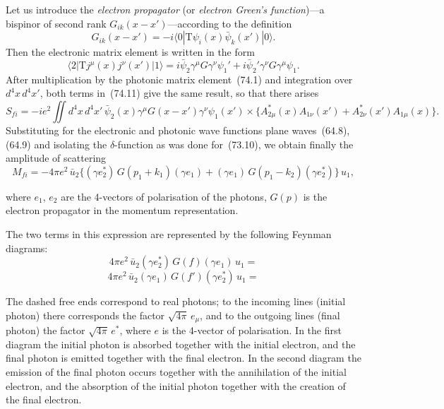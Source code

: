 Let us introduce the \textit{electron propagator} (or \textit{electron Green's function})---a bispinor of second rank $G_{ik}(x - x')$---according to the definition
\begin{equation}
G_{ik}(x - x') = -i\langle 0|\mathrm{T}\psi_i(x)\bar{\psi}_k(x')|0\rangle.
\tag{74.10}
\end{equation}
Then the electronic matrix element is written in the form
\begin{equation}
\langle 2|\mathrm{T}j^\mu(x)j^\nu(x')|1\rangle = i\bar{\psi}_2\gamma^\mu G\gamma^\nu\psi_1' + i\bar{\psi}_2'\gamma^\nu G\gamma^\mu\psi_1.
\tag{74.11}
\end{equation}
After multiplication by the photonic matrix element~(74.1) and integration over $d^4x\,d^4x'$, both terms in~(74.11) give the same result, so that there arises
\begin{equation}
S_{fi} = -ie^2\iint d^4x\,d^4x'\,\bar{\psi}_2(x)\gamma^\mu G(x - x')\gamma^\nu\psi_1(x') \times \{A^*_{2\mu}(x)A_{1\nu}(x') + A^*_{2\nu}(x')A_{1\mu}(x)\}.
\tag{74.12}
\end{equation}
Substituting for the electronic and photonic wave functions plane waves~(64.8), (64.9) and isolating the $\delta$-function as was done for~(73.10), we obtain finally the amplitude of scattering
\begin{equation}
M_{fi} = -4\pi e^2\,\bar{u}_2\{(\gamma e_2^*)\,G(p_1 + k_1)(\gamma e_1) + (\gamma e_1)\,G(p_1 - k_2)(\gamma e_2^*)\}\,u_1,
\tag{74.13}
\end{equation}

where $e_1$, $e_2$ are the 4-vectors of polarisation of the photons, $G(p)$ is the electron propagator in the momentum representation.

The two terms in this expression are represented by the following Feynman diagrams:
\begin{equation}
4\pi e^2\,\bar{u}_2(\gamma e_2^*)\,G(f)(\gamma e_1)\,u_1 =
\tag{74.14}
\end{equation}
\[
4\pi e^2\,\bar{u}_2(\gamma e_1)\,G(f')(\gamma e_2^*)\,u_1 =
\]

The dashed free ends correspond to real photons; to the incoming lines (initial photon) there corresponds the factor $\sqrt{4\pi}\,e_\mu$, and to the outgoing lines (final photon) the factor $\sqrt{4\pi}\,e^*$, where $e$ is the 4-vector of polarisation. In the first diagram the initial photon is absorbed together with the initial electron, and the final photon is emitted together with the final electron. In the second diagram the emission of the final photon occurs together with the annihilation of the initial electron, and the absorption of the initial photon together with the creation of the final electron.

